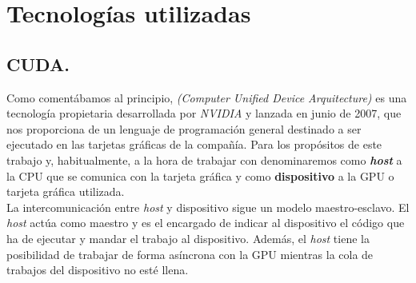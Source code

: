 \chapter{Tecnologías utilizadas}
\section{CUDA.}
Como comentábamos al principio, \cuda \textit{(Computer Unified Device Arquitecture)} \cite{cuda} es una tecnología propietaria desarrollada por \textit{NVIDIA} y lanzada en junio de 2007, que nos proporciona de un lenguaje de programación general destinado a ser ejecutado en las tarjetas gráficas de la compañía. Para los propósitos de este trabajo y, habitualmente, a la hora de trabajar con \cuda denominaremos como \textbf{\textit{host}} a la CPU que se comunica con la tarjeta gráfica y como \textbf{dispositivo} a la GPU o tarjeta gráfica utilizada. \\

La intercomunicación entre \textit{host} y dispositivo sigue un modelo maestro-esclavo. El \textit{host} actúa como maestro y es el encargado de indicar al dispositivo el código que ha de ejecutar y mandar el trabajo al dispositivo. Además, el \textit{host} tiene la posibilidad de trabajar de forma asíncrona con la GPU mientras la cola de trabajos del dispositivo no esté llena.\\

